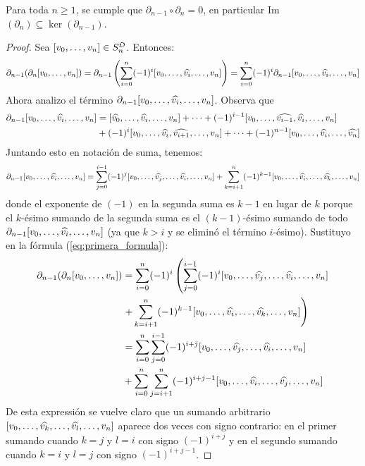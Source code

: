 \begin{ejercicio}\label{ej:53}
	Para toda $n\geq 1$, se cumple que $\partial_{n-1}\circ\partial_{n}=0$, en particular Im$(\partial_n)\subseteq\ker(\partial_{n-1})$.
\end{ejercicio}
\begin{proof}%
	Sea $[v_0,\ldots,v_n]\in S_n^{\mathfrak{O}}$. Entonces:
	\begin{equation}\label{eq:primera_formula}
		\partial_{n-1}(\partial_n[v_0,\ldots,v_n])=
		\partial_{n-1}\left( \sum_{i=0}^n(-1)^i [v_0,\ldots,\widehat{ v_i },\ldots,v_n] \right)=
		\sum_{i=0}^n(-1)^i \partial_{n-1}[v_0,\ldots,\widehat{ v_i },\ldots,v_n]
	\end{equation}
	Ahora analizo el t\'ermino $\partial_{n-1}[v_0,\ldots,\widehat{ v_i },\ldots,v_n]$. Observa que
	\begin{align*}
		\partial_{n-1}[v_0,\ldots,\widehat{ v_i },\ldots,v_n] &=
		[\widehat{ v_0 },\ldots,\widehat{ v_i },\ldots,v_n]+\cdots+(-1)^{i-1}[v_0,\ldots,\widehat{ v_{i-1} },\widehat{ v_i },\ldots,v_n] \\ &+
		(-1)^i[v_0,\ldots,\widehat{ v_{i} },\widehat{ v_{i+1} },\ldots,v_n]+\cdots+(-1)^{n-1}[v_0,\ldots,\widehat{ v_i },\ldots,\widehat{ v_n }]
	\end{align*}
	Juntando esto en notaci\'on de suma, tenemos:
	\[
		\partial_{n-1}[v_0,\ldots,\widehat{ v_i },\ldots,v_n] =
		\sum_{j=0}^{i-1}(-1)^j[v_0,\ldots,\widehat{ v_j },\ldots,\widehat{ v_i },\ldots,v_n]+\sum_{k=i+1}^{n}(-1)^{k-1}[v_0,\ldots,\widehat{ v_i },\ldots,\widehat{ v_k },\ldots,v_n]
	\]
	donde el exponente de $(-1)$ en la segunda suma es $k-1$ en lugar de $k$ porque el $k$-\'esimo sumando de la
	segunda suma es el $(k-1)$-\'esimo sumando de todo $\partial_{n-1}[v_0,\ldots,\widehat{ v_i },\ldots,v_n]$ (ya que $k>i$
	y se elimin\'o el t\'ermino $i$-\'esimo). Sustituyo en la f\'ormula (\ref{eq:primera_formula}):
	\begin{align*}
		\partial_{n-1}(\partial_n[v_0,\ldots,v_n]) &=
		\sum_{i=0}^n(-1)^i \left( \sum_{j=0}^{i-1}(-1)^i[v_0,\ldots,\widehat{ v_j },\ldots,\widehat{ v_i },\ldots,v_n] \right. \\ &
		\left. +\sum_{k=i+1}^{n}(-1)^{k-1}[v_0,\ldots,\widehat{ v_i },\ldots,\widehat{ v_k },\ldots,v_n]\right) \\ & =
		\sum_{i=0}^n\sum_{j=0}^{i-1}(-1)^{i+j}[v_0,\ldots,\widehat{ v_j },\ldots,\widehat{ v_i },\ldots,v_n] \\ & +
		\sum_{i=0}^n\sum_{j=i+1}^{n}(-1)^{i+j-1}[v_0,\ldots,\widehat{ v_i },\ldots,\widehat{ v_j },\ldots,v_n] 
	\end{align*}
	De esta expressi\'on se vuelve claro que un sumando arbitrario $[v_0,\ldots,\widehat{ v_k },\ldots,\widehat{ v_l },\ldots,v_n]$
	aparece dos veces con signo contrario: en el primer sumando cuando $k=j$ y $l=i$ con signo $(-1)^{i+j}$ y en el
	segundo sumando cuando $k=i$ y $l=j$ con signo $(-1)^{i+j-1}$.


\end{proof}
